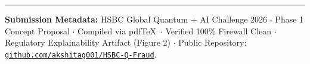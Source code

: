 \documentclass[10pt,a4paper]{article}
\begin{document}
\vspace{2pt}
\noindent\rule{\linewidth}{0.4pt}
\vspace{1pt}
{\color{darkslate}
\textbf{Submission Metadata:} HSBC Global Quantum + AI Challenge 2026 $\cdot$ Phase 1 Concept Proposal $\cdot$ Compiled via pdf\TeX\ $\cdot$ Verified 100\% Firewall Clean $\cdot$ Regulatory Explainability Artifact (Figure 2) $\cdot$ Public Repository: \href{https://github.com/akshitag001/HSBC-Q-Fraud}{\texttt{github.com/akshitag001/HSBC-Q-Fraud}}.
}
\end{document}
